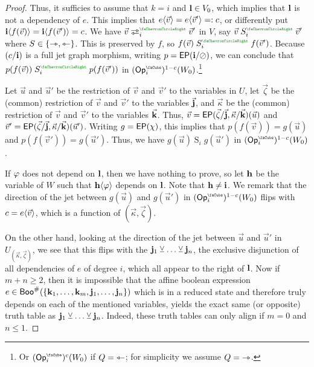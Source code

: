 \documentclass[a4paper]{memoir}
\begin{document}
\begin{proof}
	Thus, it sufficies to assume that $k = i$ and $\mathbf{l} \in V_0$, which implies that $\mathbf{l}$ is not a dependency of $e$.
	This implies that $e \langle \vec v \rangle = e \langle \vec v' \rangle =: c$, or differently put $\mathbf{i} \langle f(\vec v) \rangle = \mathbf{i} \langle f(\vec v') \rangle = c$.
	We have $\vec v \infrajet_i\pmr{\ypolar} \vec v'$ in $V$, say $\vec v \mathrel{S}_i\pmr{\ypolar} \vec v'$ where $S \in \mathopen{}\left\{ \rightarrowtriangle, \leftarrowtriangle \right\}\mathclose{}$.
	This is preserved by $f$, so $f(\vec v) \mathrel{S}_i\pmr{\ypolar} f(\vec v')$.
	Because $(c/\mathbf{i})$ is a full jet graph morphism, writing $p = \mathsf{EP}(\mathbf{i} / \oslash)$, we can conclude that $p(f(\vec v)) \mathrel{S}_i\pmr{\ypolar} p(f(\vec v'))$ in $(\Opcube_i)^{1-c}(W_0)$.\footnote{Or $(\Opcube_i)^{c}(W_0)$ if $Q = {\leftarrowtriangle}$; for simplicity we assume $Q = {\rightarrowtriangle}$.}
	
	Let $\vec u$ and $\vec u'$ be the restriction of $\vec v$ and $\vec v'$ to the variables in $U$, let $\vec \zeta$ be the (common) restriction of $\vec v$ and $\vec v'$ to the variables $\vec{\mathbf{j}}$, and $\vec \kappa$ be the (common) restriction of $\vec v$ and $\vec v'$ to the variables $\vec{\mathbf{k}}$.
	Thus, $\vec v = \mathsf{EP}(\vec \zeta/\vec{\mathbf{j}}, \vec \kappa/\vec{\mathbf{k}})(\vec u)$ and $\vec v' = \mathsf{EP}(\vec \zeta/\vec{\mathbf{j}}, \vec \kappa/\vec{\mathbf{k}})(\vec u')$.
	Writing $g = \mathsf{EP}(\chi)$, this implies that $p(f(\vec v)) = g(\vec u)$ and $p(f(\vec v')) = g(\vec u')$.
	Thus, we have $g(\vec u) \mathrel S_i g(\vec u')$ in $(\Opcube_i)^{1-c}(W_0)$.
	
	If $\varphi$ does not depend on $\mathbf{l}$, then we have nothing to prove,
	so let $\mathbf{h}$ be the variable of $W$ such that $\mathbf{h} \langle \varphi \rangle$ depends on $\mathbf{l}$. Note that $\mathbf{h} \neq \mathbf{i}$.
	We remark that the direction of the jet between $g(\vec u)$ and $g(\vec u')$ in $(\Opcube_i)^{1-c}(W_0)$ flips with $c = e \langle \vec v \rangle$, which is a function of $(\vec \kappa, \vec \zeta)$.
	
	On the other hand, looking at the direction of the jet between $\vec u$ and $\vec u'$ in $U_{(\vec \kappa, \vec \zeta)}$, we see that this flips with the $\mathbf{j}_1 \veebar \ldots \veebar \mathbf{j}_n$, the exclusive disjunction of all dependencies of $e$ of degree $i$, which all appear to the right of $\mathbf{l}$.
	Now if $m+n \geq 2$, then it is impossible that the affine boolean expression $e \in \mathsf{Boo}^\#(\mathopen{}\left\{ \mathbf{k}_1, \ldots, \mathbf{k}_m, \mathbf{j}_1, \ldots, \mathbf{j}_n \right\}\mathclose{})$ which is in a reduced state and therefore truly depends on each of the mentioned variables, yields the exact same (or opposite) truth table as $\mathbf{j}_1 \veebar \ldots \veebar \mathbf{j}_n$.
	Indeed, these truth tables can only align if $m = 0$ and $n \leq 1$.
	

\end{proof}
\end{document}
